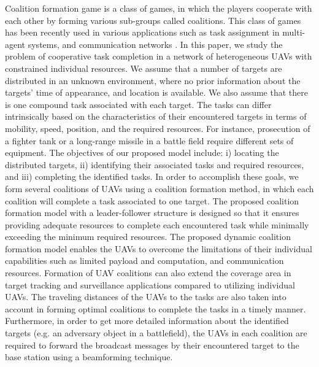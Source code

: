 \documentclass[conference]{IEEEtran}
\theoremstyle{remark}
\theoremstyle{lemma}
\begin{document}
Coalition formation game is a class of games, in which the players cooperate with each other by forming various sub-groups called coalitions. This class of games has been recently used in various applications such as task assignment in multi-agent systems, and communication networks \cite{CISS_Ashwija,Bayram,Arslan,Vig,Saad_UAV}.
In this paper, we study the problem of cooperative task completion in a network of heterogeneous UAVs with constrained individual resources. We assume that a number of targets are distributed in an unknown environment, where no prior information about the targets' time of appearance, and location is available. We also assume that there is one compound task associated with each target. The tasks can differ intrinsically based on the characteristics of their encountered targets in terms of mobility, speed, position, and the required resources. For instance, prosecution of a fighter tank or a long-range missile in a battle field require different sets of equipment.
The objectives of our proposed model include: i) locating the distributed targets, ii) identifying their associated tasks and required resources, and iii) completing the identified tasks. In order to accomplish these goals, we form several coalitions of UAVs using a coalition formation method, in which each coalition will complete a task associated to one target. The proposed coalition formation model with a leader-follower structure is designed so that it ensures providing adequate resources to complete each encountered task while minimally exceeding the minimum required resources. The proposed dynamic coalition formation model enables the UAVs to overcome the limitations of their individual capabilities such as limited payload and computation, and communication resources. Formation of UAV coalitions can also extend the coverage area in target tracking and surveillance applications compared to utilizing individual UAVs.  
The traveling distances of the UAVs to the tasks are also taken into account in forming optimal coalitions to complete the tasks in a timely manner. Furthermore, in order to get more detailed information about the identified targets (e.g. an adversary object in a battlefield), the UAVs in each coalition are required to forward the broadcast messages by their encountered target to the base station using a beamforming technique.
\end{document}
